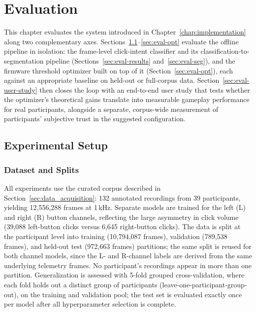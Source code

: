 \chapter{Evaluation}
\label{chap:eval}

This chapter evaluates the system introduced in Chapter~\ref{chap:implementation}
along two complementary axes. Sections~\ref{sec:eval-setup}--\ref{sec:eval-opt}
evaluate the offline pipeline in isolation: the frame-level click-intent classifier
and its classification-to-segmentation pipeline (Sections~\ref{sec:eval-results}
and~\ref{sec:eval-seg}), and the firmware threshold optimizer built on top of it
(Section~\ref{sec:eval-opt}), each against an appropriate baseline on held-out or
full-corpus data. Section~\ref{sec:eval-user-study} then closes the loop with an
end-to-end user study that tests whether the optimizer's theoretical gains translate
into measurable gameplay performance for real participants, alongside a separate,
corpus-wide measurement of participants' subjective trust in the suggested
configuration.

\section{Experimental Setup}
\label{sec:eval-setup}

\subsection{Dataset and Splits}
All experiments use the curated corpus described in Section~\ref{sec:data_acquisition}:
132 annotated recordings from 39 participants, yielding 12,556,288 frames
at 1\,kHz.  Separate models are trained for the left (L) and right (R) button channels,
reflecting the large asymmetry in click volume (39,088 left-button clicks versus 6,645
right-button clicks).  The data is split at the participant level into
training (10,794,087 frames), validation (789,538 frames), and held-out test
(972,663 frames) partitions; the same split is reused for both channel models, since
the L- and R-channel labels are derived from the same underlying telemetry frames.
No participant's recordings appear in more than one
partition.  Generalization is assessed with 5-fold grouped cross-validation, where each
fold holds out a distinct group of participants (leave-one-participant-group-out), on
the training and validation pool; the test set is evaluated exactly once per model
after all hyperparameter selection is complete.

